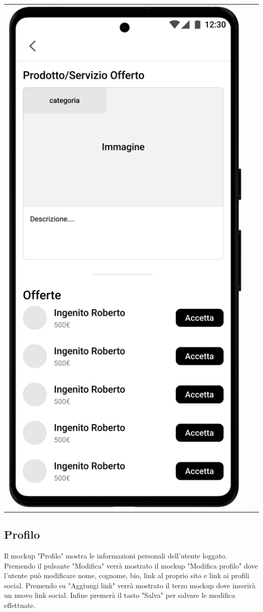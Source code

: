 \begin{center}
\begin{tabularx}{\linewidth}{>{\raggedright\arraybackslash}X>{\raggedright\arraybackslash}X>{\raggedright\arraybackslash}X}
		\includegraphics[width=.3\textwidth]{assets/mockup/Storico aste - create - Asta silenziosa in corso.png} \\
	\end{tabularx}
\end{center}

\newpage
\subsection{Profilo}
Il mockup "Profilo" mostra le informazioni personali dell'utente loggato.\\
Premendo il pulsante "Modifica" verrà mostrato il mockup "Modifica profilo" dove l'utente può modificare nome, cognome, bio, link al proprio sito e link ai profili social.
Premendo su "Aggiungi link" verrà mostrato il terzo mockup dove inserirà un nuovo link social.\meskip
Infine premerà il tasto "Salva" per salvare le modifica effettuate.

